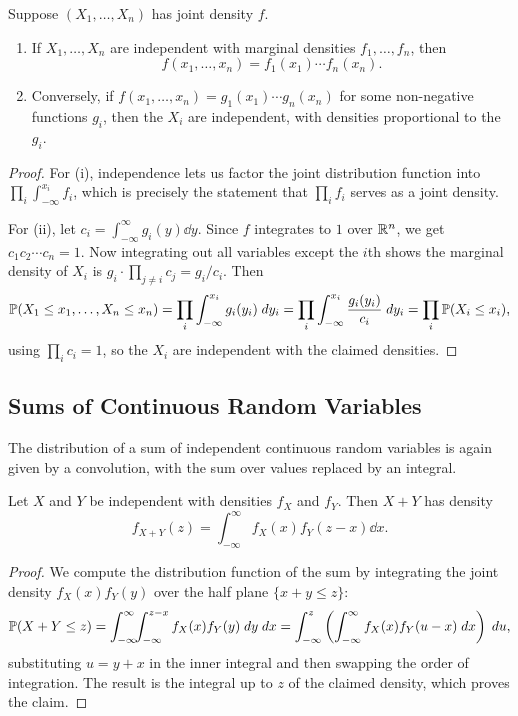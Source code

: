 \documentclass[a4paper]{scrartcl}
\begin{document}
\begin{theorem}
	Suppose $(X_1, \dots, X_n)$ has joint density $f$.
	\begin{enumerate}[label=(\roman*)]
		\item If $X_1, \dots, X_n$ are independent with marginal densities $f_1, \dots, f_n$, then
		$$
		f(x_1, \dots, x_n) = f_1(x_1)\cdots f_n(x_n).
		$$
		\item Conversely, if $f(x_1, \dots, x_n) = g_1(x_1) \cdots g_n(x_n)$ for some non-negative functions $g_i$, then the $X_i$ are independent, with densities proportional to the $g_i$.
	\end{enumerate}
\end{theorem}
\begin{proof}
	For (i), independence lets us factor the joint distribution function into $\prod_i \int_{-\infty}^{x_i} f_i$, which is precisely the statement that $\prod_i f_i$ serves as a joint density.

	For (ii), let $c_i = \int_{-\infty}^{\infty} g_i(y)\dd y$. Since $f$ integrates to $1$ over $\mathbb{R}^n$, we get $c_1 c_2 \cdots c_n = 1$. Now integrating out all variables except the $i$th shows the marginal density of $X_i$ is $g_i \cdot \prod_{j \neq i} c_j = g_i / c_i$. Then
	$$
	\mathbb{P}(X_1 \leq x_1, \dots, X_n \leq x_n) = \prod_{i} \int_{-\infty}^{x_i} g_i(y_i) \; d y_i = \prod_i \int_{-\infty}^{x_i} \frac{g_i(y_i)}{c_i}\; d y_i = \prod_i \mathbb{P}(X_i \leq x_i),
	$$
	using $\prod_i c_i = 1$, so the $X_i$ are independent with the claimed densities.
\end{proof}

\subsection{Sums of Continuous Random Variables}

The distribution of a sum of independent continuous random variables is again given by a convolution, with the sum over values replaced by an integral.

\begin{proposition}[Convolution]
	Let $X$ and $Y$ be independent with densities $f_X$ and $f_Y$. Then $X + Y$ has density
	$$
	f_{X + Y}(z) = \int_{-\infty}^{\infty} f_X(x) f_Y(z - x) \dd x.
	$$
\end{proposition}
\begin{proof}
	We compute the distribution function of the sum by integrating the joint density $f_X(x)f_Y(y)$ over the half plane $\{x + y \leq z\}$:
	$$
	\mathbb{P}(X + Y \leq z) = \int_{-\infty}^{\infty} \!\!\int_{-\infty}^{z - x} f_X(x)f_Y(y)\; d y \; d x = \int_{-\infty}^{z}\left(\int_{-\infty}^{\infty} f_X(x)f_Y(u - x)\; d x \right)\; d u,
	$$
	substituting $u = y + x$ in the inner integral and then swapping the order of integration. The result is the integral up to $z$ of the claimed density, which proves the claim.
\end{proof}
\end{document}
